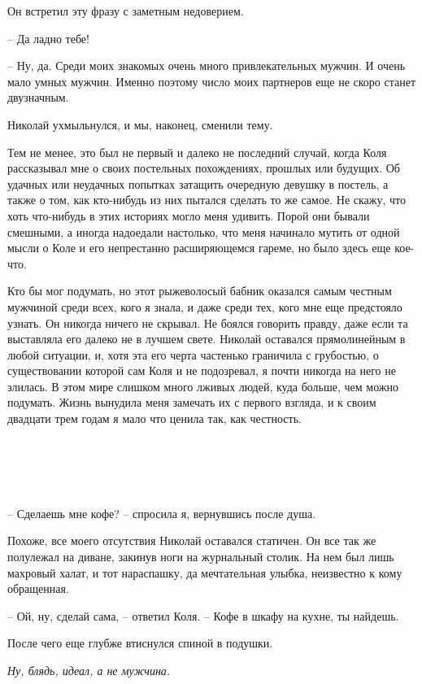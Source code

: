 \documentclass[
]{book}
\begin{document}
Он встретил эту фразу с заметным недоверием.

-- Да ладно тебе!

-- Ну, да. Среди моих знакомых очень много привлекательных мужчин. И очень мало умных мужчин. Именно поэтому число моих партнеров еще не скоро станет двузначным.

Николай ухмыльнулся, и мы, наконец, сменили тему.

Тем не менее, это был не первый и далеко не последний случай, когда Коля рассказывал мне о своих постельных похождениях, прошлых или будущих. Об удачных или неудачных попытках затащить очередную девушку в постель, а также о том, как кто-нибудь из них пытался сделать то же самое. Не скажу, что хоть что-нибудь в этих историях могло меня удивить. Порой они бывали смешными, а иногда надоедали настолько, что меня начинало мутить от одной мысли о Коле и его непрестанно расширяющемся гареме, но было здесь еще кое-что.

Кто бы мог подумать, но этот рыжеволосый бабник оказался самым честным мужчиной среди всех, кого я знала, и даже среди тех, кого мне еще предстояло узнать. Он никогда ничего не скрывал. Не боялся говорить правду, даже если та выставляла его далеко не в лучшем свете. Николай оставался прямолинейным в любой ситуации, и, хотя эта его черта частенько граничила с грубостью, о существовании которой сам Коля и не подозревал, я почти никогда на него не злилась. В этом мире слишком много лживых людей, куда больше, чем можно подумать. Жизнь вынудила меня замечать их с первого взгляда, и к своим двадцати трем годам я мало что ценила так, как честность.

\hypertarget{chapter-96}{%
\chapter{~}\label{chapter-96}}

-- Сделаешь мне кофе? -- спросила я, вернувшись после душа.

Похоже, все моего отсутствия Николай оставался статичен. Он все так же полулежал на диване, закинув ноги на журнальный столик. На нем был лишь махровый халат, и тот нараспашку, да мечтательная улыбка, неизвестно к кому обращенная.

-- Ой, ну, сделай сама, -- ответил Коля. -- Кофе в шкафу на кухне, ты найдешь.

После чего еще глубже втиснулся спиной в подушки.

\emph{Ну, блядь, идеал, а не мужчина.}
\end{document}

